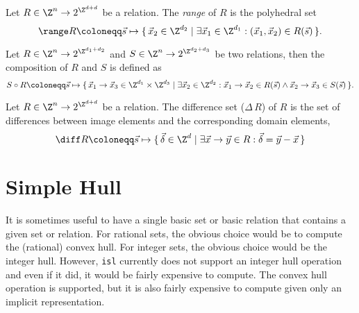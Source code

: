 \begin{definition}
Let $R \in \Z^n \to 2^{\Z^{d+d}}$ be a relation.
The {\em range} of $R$ is the polyhedral set
$$
\range R \coloneqq \vec s \mapsto
\{\, \vec x_2 \in \Z^{d_2} \mid \exists \vec x_1 \in \Z^{d_1} :
(\vec x_1, \vec x_2) \in R(\vec s) \,\}
.
$$
\end{definition}

\begin{definition}
Let $R \in \Z^n \to 2^{\Z^{d_1+d_2}}$ and
$S \in \Z^n \to 2^{\Z^{d_2+d_3}}$ be two relations,
then the composition of
$R$ and $S$ is defined as
$$
S \circ R \coloneqq
\vec s \mapsto
\{\, \vec x_1 \to \vec x_3 \in \Z^{d_1} \times \Z^{d_3}
\mid \exists \vec x_2 \in \Z^{d_2} :
\vec x_1 \to \vec x_2 \in R(\vec s) \wedge
\vec x_2 \to \vec x_3 \in S(\vec s)
\,\}
.
$$
\end{definition}

\begin{definition}
Let $R \in \Z^n \to 2^{\Z^{d+d}}$ be a relation.
The difference set ($\Delta \, R$) of $R$ is the set
of differences between image elements and the corresponding
domain elements,
$$
\diff R \coloneqq
\vec s \mapsto
\{\, \vec \delta \in \Z^{d} \mid \exists \vec x \to \vec y \in R :
\vec \delta = \vec y - \vec x
\,\}
$$
\end{definition}

\section{Simple Hull}\label{s:simple hull}

It is sometimes useful to have a single
basic set or basic relation that contains a given set or relation.
For rational sets, the obvious choice would be to compute the
(rational) convex hull.  For integer sets, the obvious choice
would be the integer hull.
However, {\tt isl} currently does not support an integer hull operation
and even if it did, it would be fairly expensive to compute.
The convex hull operation is supported, but it is also fairly
expensive to compute given only an implicit representation.

